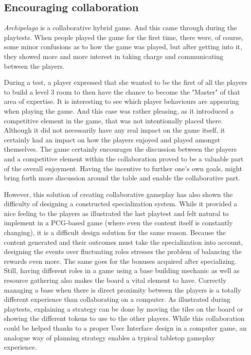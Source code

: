 \subsection{Encouraging collaboration} 
\textit{Archipelago} is a collaborative hybrid game. And this came through during the playtests. When people played the game for the first time, there were, of course, some minor confusions as to how the game was played, but after getting into it, they showed more and more interest in taking charge and communicating between the players. 

During a test, a player expressed that she wanted to be the first of all the players to build a level 3 room to then have the chance to become the "Master" of that area of expertise. It is interesting to see which player behaviours are appearing when playing the game. And this case was rather pleasing, as it introduced a competitive element in the game, that was not intentionally placed there. Although it did not necessarily have any real impact on the game itself, it certainly had an impact on how the players enjoyed and played amongst themselves. The game certainly encourages the discussion between the players and a competitive element within the collaboration proved to be a valuable part of the overall enjoyment. Having the incentive to further one's own goals, might bring forth more discussion around the table and enable the collaborative part.

However, this solution of creating collaborative gameplay has also shown the difficulty of designing a constructed specialization system. While it provided a nice feeling to the players as illustrated the last playtest and felt natural to implement in a PCG-based game (where even the content itself is constantly changing), it is a difficult design solution for the same reason. Because the content generated and their outcomes must take the specialization into account, designing the events over fluctuating roles stresses the problem of balancing the rewards even more. The same goes for the bonuses acquired after specializing. Still, having different roles in a game using a base building mechanic as well as resource gathering also makes the board a vital element to have. Correctly managing a base when there is direct proximity between the players is a totally different experience than collaborating on a computer. As illustrated during playtests, explaining a strategy can be done by moving the tiles on the board or showing the different tokens to use to the other players. While this collaboration could be helped thanks to a proper User Interface design in a computer game, an analogue way of planning strategy enables a typical tabletop gameplay experience.

